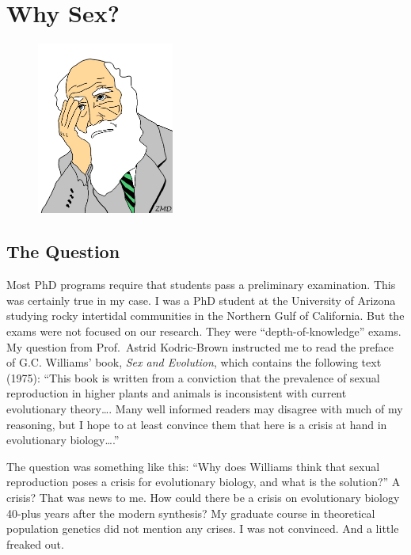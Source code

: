 \documentclass[
  letterpaper,
]{book}
\begin{document}
\hypertarget{sec-why-sex}{%
\chapter{Why Sex?}\label{sec-why-sex}}

\begin{figure}

{\centering \includegraphics[width=0.4\textwidth,height=\textheight]{images/Picture1.png}

}

\end{figure}

\hypertarget{the-question}{%
\section{The Question}\label{the-question}}

Most PhD programs require that students pass a preliminary examination.
This was certainly true in my case. I was a PhD student at the
University of Arizona studying rocky intertidal communities in the
Northern Gulf of California. But the exams were not focused on our
research. They were ``depth-of-knowledge'' exams. My question from
Prof.~Astrid Kodric-Brown instructed me to read the preface of G.C.
Williams' book, \emph{Sex and Evolution}, which contains the following
text (1975): ``This book is written from a conviction that the
prevalence of sexual reproduction in higher plants and animals is
inconsistent with current evolutionary theory\ldots. Many well informed
readers may disagree with much of my reasoning, but I hope to at least
convince them that here is a crisis at hand in evolutionary
biology\ldots.''

The question was something like this: ``Why does Williams think that
sexual reproduction poses a crisis for evolutionary biology, and what is
the solution?'' A crisis? That was news to me. How could there be a
crisis on evolutionary biology 40-plus years after the modern synthesis?
My graduate course in theoretical population genetics did not mention
any crises. I was not convinced. And a little freaked out.
\end{document}
